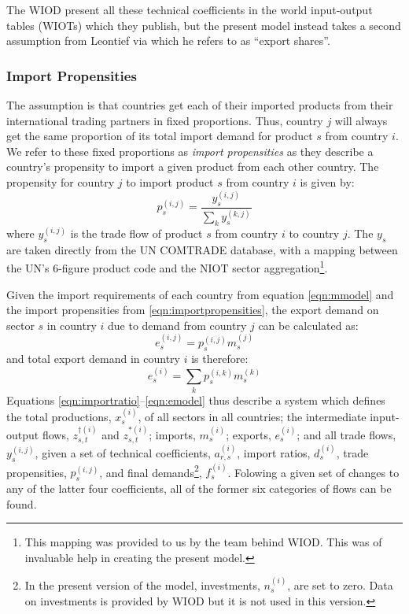 \documentclass[a4paper]{article}
\begin{document}
The WIOD present all these technical coefficients in the world input-output tables (WIOTs) which they publish, but the present model instead takes a second assumption from Leontief via \textcite{duchin_international_2004} which he refers to as ``export shares''.

\subsubsection*{Import Propensities}
The assumption is that countries get each of their imported products from their international trading partners in fixed proportions.
Thus, country $j$ will always get the same proportion of its total import demand for product $s$ from country $i$.
We refer to these fixed proportions as \textit{import propensities} as they describe a country's propensity to import a given product from each other country.
The propensity for country $j$ to import product $s$ from country $i$ is given by:
\begin{equation}\label{eqn:importpropensities}
p^{(i,j)}_s = \frac{y^{(i,j)}_s}{\sum_k{y^{(k,j)}_s}}
\end{equation}
where $y^{(i,j)}_s$ is the trade flow of product $s$ from country $i$ to country $j$. The $y_s$ are taken directly from the UN COMTRADE database, with a mapping between the UN's 6-figure product code and the NIOT sector aggregation\footnote{This mapping was provided to us by the team behind WIOD. This was of invaluable help in creating the present model.}.

Given the import requirements of each country from equation \eqref{eqn:mmodel} and the import propensities from \eqref{eqn:importpropensities}, the export demand on sector $s$ in country $i$ due to demand from country $j$ can be calculated as:
\begin{equation*}
e_s^{(i,j)} = p_s^{(i,j)}m_s^{(j)}
\end{equation*}
and total export demand in country $i$ is therefore:
\begin{equation}\label{eqn:emodel}
e_s^{(i)} = \sum_k{p_s^{(i,k)}m_s^{(k)}}
\end{equation}
\noindent Equations \eqref{eqn:importratio}--\eqref{eqn:emodel} thus describe a system which defines the total productions, $x_s^{(i)}$, of all sectors in all countries; the intermediate input-output flows, $z_{s,t}^{\dagger(i)}$ and $z_{s,t}^{*(i)}$; imports, $m_s^{(i)}$; exports, $e_s^{(i)}$; and all trade flows, $y_s^{(i,j)}$, given a set of technical coefficients, $a_{r,s}^{(i)}$, import ratios, $d_s^{(i)}$, trade propensities, $p_s^{(i,j)}$, and final demands\footnote{In the present version of the model, investments, $n_s^{(i)}$, are set to zero. 
Data on investments is provided by WIOD but it is not used in this version.}, $f_s^{(i)}$. Folowing a given set of changes to any of the latter four coefficients, all of the former six categories of flows can be found.
\end{document}
